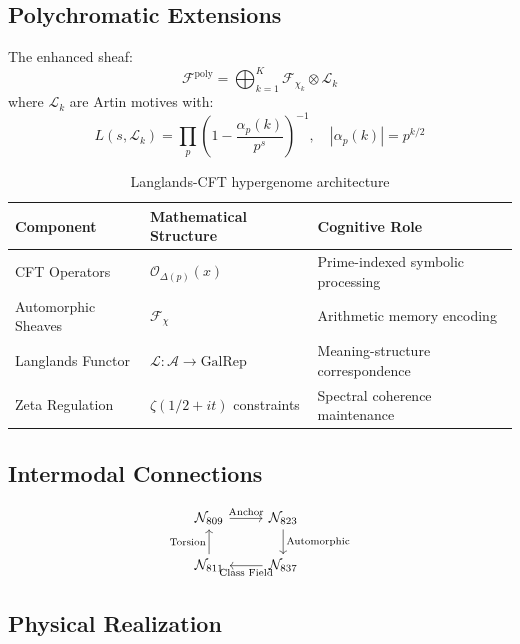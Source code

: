\documentclass[12pt]{article}
\begin{document}
\subsection{Polychromatic Extensions}

The enhanced sheaf:
\begin{equation}
\mathcal{F}^{\text{poly}} = \bigoplus_{k=1}^K \mathcal{F}_{\chi_k} \otimes \mathcal{L}_k
\end{equation}
where $\mathcal{L}_k$ are Artin motives with:
\begin{equation}
L(s, \mathcal{L}_k) = \prod_p \left(1 - \frac{\alpha_p(k)}{p^s}\right)^{-1}, \quad |\alpha_p(k)| = p^{k/2}
\end{equation}

\begin{table}[h]
\centering
\begin{tabular}{lll}
\toprule
Component & Mathematical Structure & Cognitive Role \\
\midrule
CFT Operators & $\mathcal{O}_{\Delta(p)}(x)$ & Prime-indexed symbolic processing \\
Automorphic Sheaves & $\mathcal{F}_\chi$ & Arithmetic memory encoding \\
Langlands Functor & $\mathcal{L}: \mathcal{A} \to \text{GalRep}$ & Meaning-structure correspondence \\
Zeta Regulation & $\zeta(1/2 + it)$ constraints & Spectral coherence maintenance \\
\bottomrule
\end{tabular}
\caption{Langlands-CFT hypergenome architecture}
\end{table}

\subsection{Intermodal Connections}

\begin{equation}
\begin{tikzcd}
\mathcal{N}_{809} \arrow[r, "\text{Anchor}"] & \mathcal{N}_{823} \arrow[d, "\text{Automorphic}"] \\
\mathcal{N}_{811} \arrow[u, "\text{Torsion}"] & \mathcal{N}_{837} \arrow[l, "\text{Class Field}"]
\end{tikzcd}
\end{equation}

\subsection{Physical Realization}
\end{document}
